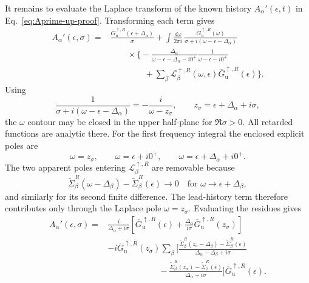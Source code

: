 \documentclass[
 reprint,
 superscriptaddress,
 amsmath,amssymb,
 aps,prb,
 longbibliography,
 floatfix
]{revtex4-2}
\begin{document}
It remains to evaluate the Laplace transform of the known history $A_\alpha'(\epsilon,t)$ in Eq.~\eqref{eq:Aprime-up-proof}. Transforming each term gives
\begin{align*}
A_\alpha'(\epsilon,\sigma)
={}&
\frac{\overline G_{\mathrm u}^{\uparrow,R}(\epsilon+\Delta_\alpha)}
{\sigma}
+
\int\frac{d\omega}{2\pi i}\,
\frac{\overline G_{\mathrm u}^{\uparrow,R}(\omega)}
{\sigma+i(\omega-\epsilon-\Delta_\alpha)}
\\
&\qquad\times
\Bigg\{
-\frac{\Delta_\alpha}
{\omega-\epsilon-\Delta_\alpha-i0^+}
\frac{1}
{\omega-\epsilon-i0^+}
\\
&\qquad\qquad
+
\sum_\beta
\mathcal L_\beta^{\uparrow,R}
(\omega,\epsilon)
\overline G_{\mathrm u}^{\uparrow,R}(\epsilon)
\Bigg\}.
\end{align*}
Using
\begin{equation*}
\frac{1}
{\sigma+i(\omega-\epsilon-\Delta_\alpha)}
=
-\frac{i}{\omega-z_\sigma},
\qquad
z_\sigma=\epsilon+\Delta_\alpha+i\sigma,
\end{equation*}
the $\omega$ contour may be closed in the upper half-plane for $\Re\sigma>0$. All retarded functions are analytic there. For the first frequency integral the enclosed explicit poles are
\begin{equation*}
\omega=z_\sigma,\qquad
\omega=\epsilon+i0^+,\qquad
\omega=\epsilon+\Delta_\alpha+i0^+.
\end{equation*}
The two apparent poles entering
$\mathcal L_\beta^{\uparrow,R}$ are removable because
\begin{equation*}
\widetilde\Sigma_\beta^R(\omega-\Delta_\beta)
-\widetilde\Sigma_\beta^R(\epsilon)
\longrightarrow0
\quad
\text{for }
\omega\rightarrow\epsilon+\Delta_\beta,
\end{equation*}
and similarly for its second finite difference. The lead-history term therefore contributes only through the Laplace pole $\omega=z_\sigma$. Evaluating the residues gives
\begin{equation*}
\begin{aligned}
A_\alpha'(\epsilon,\sigma)
={}&
\frac{i}{\Delta_\alpha+i\sigma}
\left[
\overline G_{\mathrm u}^{\uparrow,R}(\epsilon)
+
\frac{\Delta_\alpha}{i\sigma}
\overline G_{\mathrm u}^{\uparrow,R}(z_\sigma)
\right]
\\
&-
i\overline G_{\mathrm u}^{\uparrow,R}(z_\sigma)
\sum_\beta
\Bigg[
\frac{
\widetilde\Sigma_\beta^R(z_\sigma-\Delta_\beta)
-\widetilde\Sigma_\beta^R(\epsilon)}
{\Delta_\alpha-\Delta_\beta+i\sigma}
\\
&\hspace{6em}
-
\frac{
\widetilde\Sigma_\beta^R(z_\sigma)
-\widetilde\Sigma_\beta^R(\epsilon)}
{\Delta_\alpha+i\sigma}
\Bigg]
\overline G_{\mathrm u}^{\uparrow,R}(\epsilon).
\end{aligned}
\end{equation*}
\end{document}
